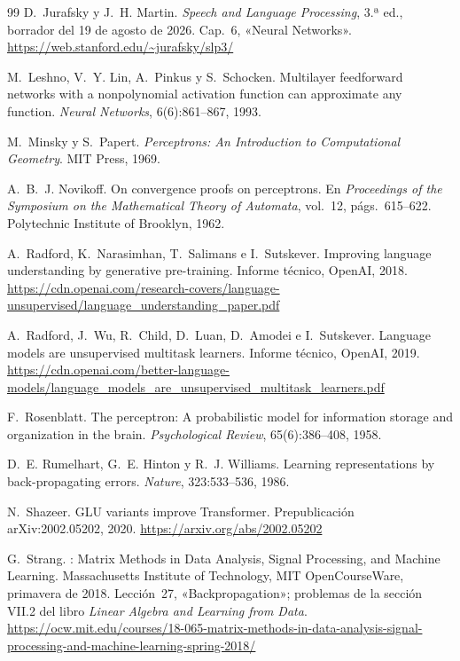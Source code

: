 \begin{thebibliography}{99}
D.~Jurafsky y J.~H. Martin.
\newblock \emph{Speech and Language Processing}, 3.ª ed., borrador del 19 de agosto de 2026.
\newblock Cap.~6, «Neural Networks».
\newblock \url{https://web.stanford.edu/~jurafsky/slp3/}

M.~Leshno, V.~Y. Lin, A.~Pinkus y S.~Schocken.
\newblock Multilayer feedforward networks with a nonpolynomial activation function can approximate any function.
\newblock \emph{Neural Networks}, 6(6):861--867, 1993.

M.~Minsky y S.~Papert.
\newblock \emph{Perceptrons: An Introduction to Computational Geometry}.
\newblock MIT Press, 1969.

A.~B.~J. Novikoff.
\newblock On convergence proofs on perceptrons.
\newblock En \emph{Proceedings of the Symposium on the Mathematical Theory of Automata}, vol.~12, págs.~615--622. Polytechnic Institute of Brooklyn, 1962.

A.~Radford, K.~Narasimhan, T.~Salimans e I.~Sutskever.
\newblock Improving language understanding by generative pre-training.
\newblock Informe técnico, OpenAI, 2018.
\newblock \url{https://cdn.openai.com/research-covers/language-unsupervised/language_understanding_paper.pdf}

A.~Radford, J.~Wu, R.~Child, D.~Luan, D.~Amodei e I.~Sutskever.
\newblock Language models are unsupervised multitask learners.
\newblock Informe técnico, OpenAI, 2019.
\newblock \url{https://cdn.openai.com/better-language-models/language_models_are_unsupervised_multitask_learners.pdf}

F.~Rosenblatt.
\newblock The perceptron: A probabilistic model for information storage and organization in the brain.
\newblock \emph{Psychological Review}, 65(6):386--408, 1958.

D.~E. Rumelhart, G.~E. Hinton y R.~J. Williams.
\newblock Learning representations by back-propagating errors.
\newblock \emph{Nature}, 323:533--536, 1986.

N.~Shazeer.
\newblock GLU variants improve Transformer.
\newblock Prepublicación arXiv:2002.05202, 2020.
\newblock \url{https://arxiv.org/abs/2002.05202}

G.~Strang.
: Matrix Methods in Data Analysis, Signal Processing, and Machine Learning.
\newblock Massachusetts Institute of Technology, MIT OpenCourseWare, primavera de 2018.
\newblock Lección~27, «Backpropagation»; problemas de la sección VII.2 del libro \emph{Linear Algebra and Learning from Data}.
\newblock \url{https://ocw.mit.edu/courses/18-065-matrix-methods-in-data-analysis-signal-processing-and-machine-learning-spring-2018/}


\end{thebibliography}
